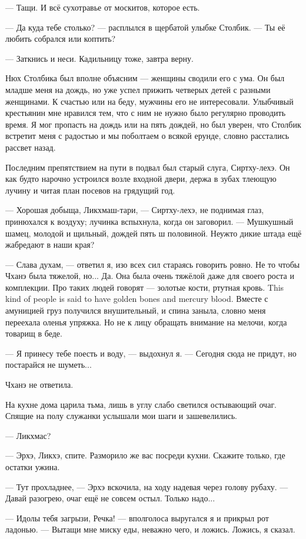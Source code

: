--- Тащи.
И всё сухотравье от москитов, которое есть.

--- Да куда тебе столько? --- расплылся в щербатой улыбке Столбик.
--- Ты её любить собрался или коптить?

--- Заткнись и неси.
Кадильницу тоже, завтра верну.

Нюх Столбика был вполне объясним --- женщины сводили его с ума.
Он был младше меня на дождь, но уже успел прижить четверых детей с разными женщинами.
К счастью или на беду, мужчины его не интересовали.
Улыбчивый крестьянин мне нравился тем, что с ним не нужно было регулярно проводить время.
Я мог пропасть на дождь или на пять дождей, но был уверен, что Столбик встретит меня с радостью и мы поболтаем о
всякой ерунде, словно расстались рассвет назад.

Последним препятствием на пути в подвал был старый слуга, Сиртху-лехэ.
Он как будто нарочно устроился возле входной двери, держа в зубах тлеющую лучину и читая план посевов на грядущий год.

--- Хорошая добыща, Ликхмаш-тари, --- Сиртху-лехэ, не поднимая глаз, принюхался к воздуху;
лучинка вспыхнула, когда он заговорил.
--- Мушкушный шамец, молодой и щильный, дождей пять ш половиной.
Неужто дикие штада ещё жабредают в наши края?

--- Слава духам, --- ответил я, изо всех сил стараясь говорить ровно.
Не то чтобы Чханэ была тяжелой, но...
Да.
Она была очень тяжёлой даже для своего роста и комплекции.
{Про таких людей говорят --- золотые кости, ртутная кровь.}
{This kind of people is said to have golden bones and mercury blood.}
Вместе с амуницией груз получился внушительный, и спина заныла, словно меня переехала оленья упряжка.
Но не к лицу обращать внимание на мелочи, когда товарищ в беде.

--- Я принесу тебе поесть и воду, --- выдохнул я.
--- Сегодня сюда не придут, но постарайся не шуметь...

Чханэ не ответила.

На кухне дома царила тьма, лишь в углу слабо светился остывающий очаг.
Спящие на полу служанки услышали мои шаги и зашевелились.

--- Ликхмас?

--- Эрхэ, Ликхэ, спите.
Разморило же вас посреди кухни.
Скажите только, где остатки ужина.

--- Тут прохладнее, --- Эрхэ вскочила, на ходу надевая через голову рубаху.
--- Давай разогрею, очаг ещё не совсем остыл.
Только надо...

--- Идолы тебя загрызи, Речка! --- вполголоса выругался я и прикрыл рот ладонью.
--- Вытащи мне миску еды, неважно чего, и ложись.
Ложись, я сказал.

